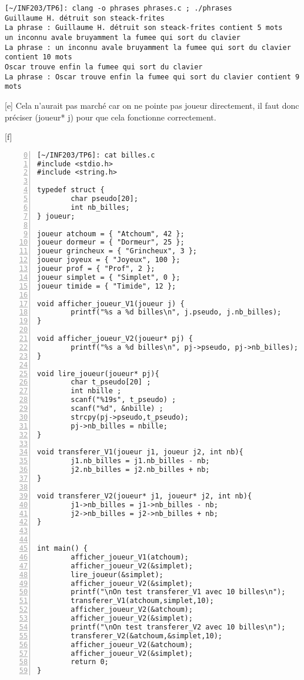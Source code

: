 \documentclass[12pt,a4paper,notitlepage,colorinlistoftodos]{article}
\begin{document}
\begin{lstlisting}
[~/INF203/TP6]: clang -o phrases phrases.c ; ./phrases
Guillaume H. détruit son steack-frites
La phrase : Guillaume H. détruit son steack-frites contient 5 mots
un inconnu avale bruyamment la fumee qui sort du clavier
La phrase : un inconnu avale bruyamment la fumee qui sort du clavier contient 10 mots
Oscar trouve enfin la fumee qui sort du clavier
La phrase : Oscar trouve enfin la fumee qui sort du clavier contient 9 mots
\end{lstlisting}


[e]
Cela n'aurait pas marché car on ne pointe pas joueur directement, il faut donc préciser (joueur* j) pour que cela fonctionne 
correctement.


[f]
\begin{lstlisting}[numbers=left, firstnumber = 0 ]
[~/INF203/TP6]: cat billes.c
#include <stdio.h>
#include <string.h>

typedef struct {
        char pseudo[20];
        int nb_billes;
} joueur;

joueur atchoum = { "Atchoum", 42 };
joueur dormeur = { "Dormeur", 25 };
joueur grincheux = { "Grincheux", 3 };
joueur joyeux = { "Joyeux", 100 };
joueur prof = { "Prof", 2 };
joueur simplet = { "Simplet", 0 };
joueur timide = { "Timide", 12 };

void afficher_joueur_V1(joueur j) {
        printf("%s a %d billes\n", j.pseudo, j.nb_billes);
}

void afficher_joueur_V2(joueur* pj) {
        printf("%s a %d billes\n", pj->pseudo, pj->nb_billes);
}

void lire_joueur(joueur* pj){
        char t_pseudo[20] ;
        int nbille ;
        scanf("%19s", t_pseudo) ;
        scanf("%d", &nbille) ;
        strcpy(pj->pseudo,t_pseudo);
        pj->nb_billes = nbille;
}

void transferer_V1(joueur j1, joueur j2, int nb){
        j1.nb_billes = j1.nb_billes - nb;
        j2.nb_billes = j2.nb_billes + nb;
}

void transferer_V2(joueur* j1, joueur* j2, int nb){
        j1->nb_billes = j1->nb_billes - nb;
        j2->nb_billes = j2->nb_billes + nb;
}


int main() {
        afficher_joueur_V1(atchoum);
        afficher_joueur_V2(&simplet);
        lire_joueur(&simplet);
        afficher_joueur_V2(&simplet);
        printf("\nOn test transferer_V1 avec 10 billes\n");
        transferer_V1(atchoum,simplet,10);
        afficher_joueur_V2(&atchoum);
        afficher_joueur_V2(&simplet);
        printf("\nOn test transferer_V2 avec 10 billes\n");
        transferer_V2(&atchoum,&simplet,10);
        afficher_joueur_V2(&atchoum);
        afficher_joueur_V2(&simplet);
        return 0;
}
\end{lstlisting}
\end{document}
